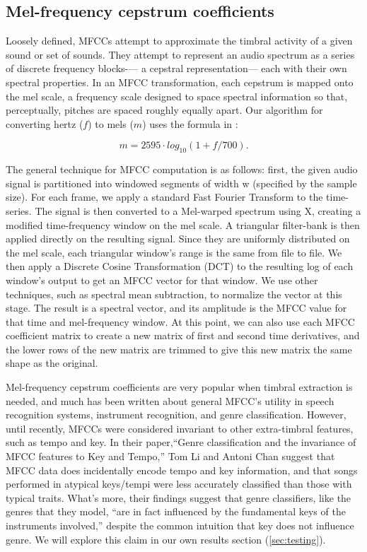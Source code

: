 \documentclass[12pt,twocolumn,titlepage]{article}
\begin{document}
\subsection{Mel-frequency cepstrum coefficients}

Loosely defined, MFCCs attempt to approximate the timbral activity of a given sound or set of sounds. They attempt to represent an audio spectrum as a series of discrete frequency blocks-— a cepstral representation— each with their own spectral properties. In an MFCC transformation, each cepstrum is mapped onto the mel scale, a frequency scale designed to space spectral information so that, perceptually, pitches are spaced roughly equally apart. Our algorithm for converting hertz ($f$) to mels ($m$) uses the formula in \cite{Speechcomm}: 

\begin{equation}\label{}
m = 2595 \cdot log_{10}(1 + f/700).
\end{equation}

The general technique for MFCC computation is as follows: first, the given audio signal is partitioned into windowed segments of width w (specified by the sample size). For each frame, we apply a standard Fast Fourier Transform to the time-series. The signal is then converted to a Mel-warped spectrum using X, creating a modified time-frequency window on the mel scale. A triangular filter-bank is then applied directly on the resulting signal. Since they are uniformly distributed on the mel scale, each triangular window's range is the same from file to file. \cite{Essid} We then apply a Discrete Cosine Transformation (DCT) to the resulting log of each window's output to get an MFCC vector for that window. We use other techniques, such as spectral mean subtraction, to normalize the vector at this stage. The result is a spectral vector, and its amplitude is the MFCC value for that time and mel-frequency window. At this point, we can also use each MFCC coefficient matrix to create a new matrix of first and second time derivatives, and the lower rows of the new matrix are trimmed to give this new matrix the same shape as the original. 


Mel-frequency cepstrum coefficients are very popular when timbral extraction is needed, and much has been written about general MFCC's utility in speech recognition systems, instrument recognition, and genre classification. However, until recently, MFCCs were considered invariant to other extra-timbral features, such as tempo and key. In their paper,``Genre classification and the invariance of MFCC features to Key and Tempo,'' Tom Li and Antoni Chan suggest that MFCC data does incidentally encode tempo and key information, and that songs performed in atypical keys/tempi were less accurately classified than those with typical traits. What's more, their findings suggest that genre classifiers, like the genres that they model, ``are in fact influenced by the fundamental keys of the instruments involved,'' despite the common intuition that key does not influence genre. \cite{LiChan} We will explore this claim in our own results section (\ref{sec:testing}).
\end{document}
